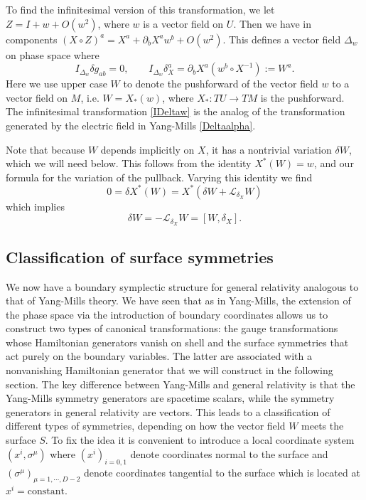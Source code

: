 \documentclass[a4paper,11pt]{article}
\begin{document}
To find the infinitesimal version of this transformation, we let $Z = I + w+O(w^2)$, where $w$ is a vector field on $U$.
Then we have in components $(X \circ Z)^a = X^a + {\partial_b X^a} w^b +O(w^2)$. 
This defines a vector field $\Delta_w$ on phase space where 
\begin{equation} \label{IDeltaw}
I_{\Delta_w} \delta g_{ab} = 0, \qquad I_{\Delta_w} \delta_X^a =  {\partial_b X^a} ( w^b \circ X^{-1}) := W^a.
\end{equation}
Here we use upper case $W$ to denote the pushforward of the vector field $w$ to a vector field on $M$, i.e. $W = X_*(w)$, where $X_*: T U \to TM$ is the pushforward.
The infinitesimal transformation \eqref{IDeltaw} is the analog of the transformation generated by the electric field in Yang-Mills \eqref{Deltaalpha}.

Note that because $W$ depends implicitly on $X$, it has a nontrivial variation $\delta W$, which we will need below.
This follows from the identity $X^*(W) = w$, and our formula for the variation of the pullback. 
Varying this identity we find 
\begin{equation}
0 = \delta X^*(W) = X^*( \delta W + \mathcal{L}_{\delta_X} W )
\end{equation}
which implies
\begin{equation} \label{deltapushforward}
\delta W = - \mathcal{L}_{\delta_X} W = [W,\delta_X].
\end{equation}

\subsection{Classification of surface symmetries}

We now have a boundary symplectic structure for general relativity analogous to that of Yang-Mills theory. 
We have seen that as in Yang-Mills, the extension of the phase space via the introduction of boundary coordinates allows us to construct two types of canonical transformations: the gauge transformations whose Hamiltonian generators vanish on shell and the surface symmetries that act purely on the boundary variables. 
The latter are associated with a nonvanishing Hamiltonian generator that we will construct in the following section.
The key difference between Yang-Mills and general relativity is that the Yang-Mills symmetry generators are spacetime scalars, while the symmetry generators in general relativity are vectors.
This leads to a classification of different types of symmetries, depending on how the vector field $W$ meets the surface $S$.
To fix the idea it is convenient to introduce a local coordinate system $(x^i,\sigma^\mu)$ where $(x^i)_{i=0,1}$ denote coordinates normal to the surface and $(\sigma^\mu)_{\mu=1,\cdots, D-2}$ denote coordinates tangential to the surface which is located at $x^i= \text{constant}$.
\end{document}
